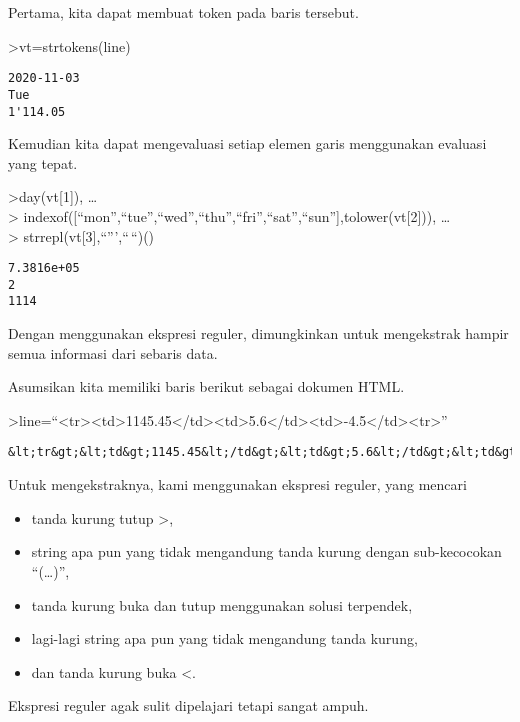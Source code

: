 \documentclass[
]{book}
\begin{document}
Pertama, kita dapat membuat token pada baris tersebut.

\textgreater vt=strtokens(line)

\begin{verbatim}
2020-11-03
Tue
1'114.05
\end{verbatim}

Kemudian kita dapat mengevaluasi setiap elemen garis menggunakan evaluasi yang tepat.

\textgreater day(vt{[}1{]}), \ldots{}\\
\textgreater{} indexof({[}``mon'',``tue'',``wed'',``thu'',``fri'',``sat'',``sun''{]},tolower(vt{[}2{]})), \ldots{}\\
\textgreater{} strrepl(vt{[}3{]},``''',``\,``)()

\begin{verbatim}
7.3816e+05
2
1114
\end{verbatim}

Dengan menggunakan ekspresi reguler, dimungkinkan untuk mengekstrak hampir semua informasi dari sebaris data.

Asumsikan kita memiliki baris berikut sebagai dokumen HTML.

\textgreater line=``\textless tr\textgreater\textless td\textgreater1145.45\textless/td\textgreater\textless td\textgreater5.6\textless/td\textgreater\textless td\textgreater-4.5\textless/td\textgreater\textless tr\textgreater{}''

\begin{verbatim}
&lt;tr&gt;&lt;td&gt;1145.45&lt;/td&gt;&lt;td&gt;5.6&lt;/td&gt;&lt;td&gt;-4.5&lt;/td&gt;&lt;tr&gt;
\end{verbatim}

Untuk mengekstraknya, kami menggunakan ekspresi reguler, yang mencari

\begin{itemize}
\item
  tanda kurung tutup \textgreater,
\item
  string apa pun yang tidak mengandung tanda kurung dengan sub-kecocokan ``(\ldots)'',
\item
  tanda kurung buka dan tutup menggunakan solusi terpendek,
\item
  lagi-lagi string apa pun yang tidak mengandung tanda kurung,
\item
  dan tanda kurung buka \textless.
\end{itemize}

Ekspresi reguler agak sulit dipelajari tetapi sangat ampuh.
\end{document}
